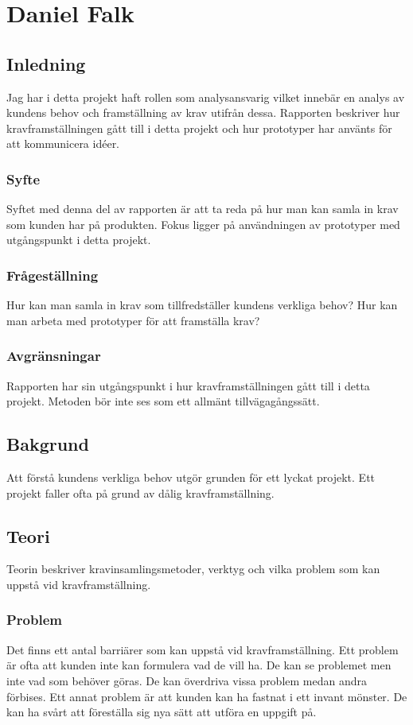 \section{Daniel Falk}
\subsection{Inledning}
Jag har i detta projekt haft rollen som analysansvarig vilket innebär en analys av kundens behov och framställning av krav utifrån dessa. Rapporten beskriver hur kravframställningen gått till i detta projekt och hur prototyper har använts för att kommunicera idéer.
\subsubsection{Syfte}
Syftet med denna del av rapporten är att ta reda på hur man kan samla in krav som kunden har på produkten. Fokus ligger på användningen av prototyper med utgångspunkt i detta projekt.
\subsubsection{Frågeställning}
Hur kan man samla in krav som tillfredställer kundens verkliga behov?
Hur kan man arbeta med prototyper för att framställa krav?
\subsubsection{Avgränsningar}
Rapporten har sin utgångspunkt i hur kravframställningen gått till i detta projekt. Metoden bör inte ses som ett allmänt tillvägagångssätt.
\subsection{Bakgrund}
Att förstå kundens verkliga behov utgör grunden för ett lyckat projekt. Ett projekt faller ofta på grund av dålig kravframställning. %
\subsection{Teori}
Teorin beskriver kravinsamlingsmetoder, verktyg och vilka problem som kan uppstå vid kravframställning. 
\subsubsection{Problem}
Det finns ett antal barriärer som kan uppstå vid kravframställning. Ett problem är ofta att kunden inte kan formulera vad de vill ha. De kan se problemet men inte vad som behöver göras. De kan överdriva vissa problem medan andra förbises. 
Ett annat problem är att kunden kan ha fastnat i ett invant mönster. De kan ha svårt att föreställa sig nya sätt att utföra en uppgift på.
\cite{Lauesen} %

